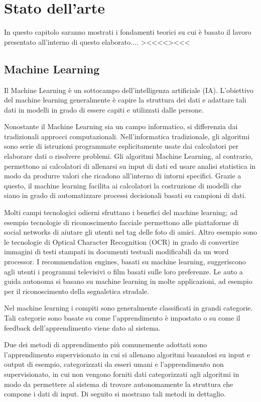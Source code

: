 \chapter{Stato dell'arte}
\label{statodellarte}
In questo capitolo saranno mostrati i fondamenti teorici su cui è basato il lavoro presentato all'interno di questo elaborato.... ><<<<><<<

\newpage
\section{Machine Learning}
Il Machine Learning è un sottocampo dell'intelligenza artificiale (IA). L'obiettivo del machine learning generalmente è capire la struttura dei dati e adattare tali dati in modelli in grado di essere capiti e utilizzati dalle persone.

Nonostante il Machine Learning sia un campo informatico, si differenzia dai tradizionali approcci computazionali. Nell'informatica tradizionale, gli algoritmi sono serie di istruzioni programmate esplicitamente usate dai calcolatori per elaborare dati o risolvere problemi. Gli algoritmi Machine Learning, al contrario, permettono ai calcolatori di allenarsi su input di dati ed usare analisi statistica in modo da produrre valori che ricadono all'interno di intorni specifici. Grazie a questo, il machine learning facilita ai calcolatori la costruzione di modelli che siano in grado di automatizzare processi decisionali basati su campioni di dati.

Molti campi tecnologici odierni sfruttano i benefici del machine learning; ad esempio tecnologie di riconoscimento facciale permettono alle piattaforme di social networks di aiutare gli utenti nel tag delle foto di amici. Altro esempio sono le tecnologie di Optical Character Recognition (OCR) in grado di convertire immagini di testi stampati in documenti testuali modificabili da un word processor. I recommendation engines, basati su machine learning, suggeriscono agli utenti i programmi televisivi o film basati sulle loro preferenze. Le auto a guida autonoma si basano su machine learning in molte applicazioni, ad esempio per il riconoscimento della segnaletica stradale.

Nel machine learning i compiti sono generalmente classificati in grandi categorie. Tali categorie sono basate su come l'apprendimento è impostato o su come il feedback dell'apprendimento viene dato al sistema.

Due dei metodi di apprendimento più comunemente adottati sono l'apprendimento supervisionato in cui si allenano algoritmi basandosi su input e output di esempio, categorizzati da esseri umani e l'apprendimento non supervisionato, in cui non vengono forniti dati categorizzati agli algoritmi in modo da permettere al sistema di trovare autonomamente la struttura che compone i dati di input. Di seguito si mostrano tali metodi in dettaglio.

